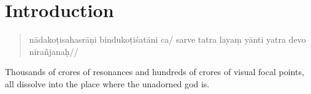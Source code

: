 %
\chapter{Introduction}
\mainmatter

\begin{quote}
nādakoṭisahasrāṇi bindukoṭiśatāni ca/
sarve tatra layaṃ yānti yatra devo nirañjanaḥ//
\end{quote}

Thousands of crores of resonances and hundreds of crores of visual focal points, all dissolve into the place where the unadorned god is.


